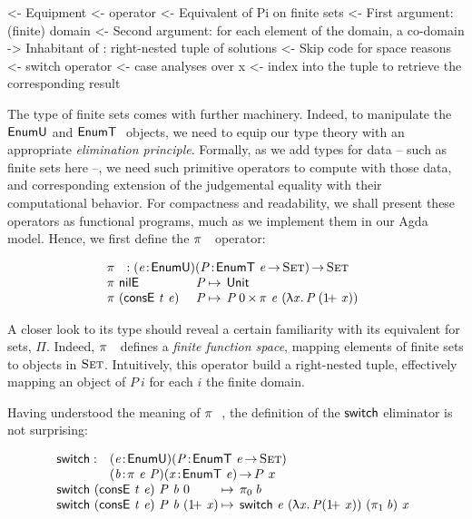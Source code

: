 \begin{wstructure}
<- Equipment
    <- \spi operator
        <- Equivalent of Pi on finite sets
        <- First argument: (finite) domain
        <- Second argument: for each element of the domain, a co-domain
        -> Inhabitant of \spi: right-nested tuple of solutions
            <- Skip code for space reasons
    <- switch operator
        <- case analyses over x
        <- index into the \spi tuple to retrieve the corresponding result
\end{wstructure}

The type of finite sets comes with further machinery. Indeed, to
manipulate the $\EnumU$ and $\EnumT{}$ objects, we need to equip our
type theory with an appropriate \emph{elimination
  principle}. Formally, as we add types for data -- such as finite
sets here --, we need such primitive operators to compute with those
data, and corresponding extension of the judgemental equality with
their computational behavior. For compactness and readability, we
shall present these operators as functional programs, much as we
implement them in our Agda model. Hence, we first define the
$\spi{}{}$ operator:

\[\stk{
\spi{}{} : \PITEL{\V{e}}{\EnumU}
           \PITEL{\V{P}}{\EnumT{\V{e}} \To \Set} \To \Set \\
\begin{array}{@{}ll@{\:\mapsto\:\:}l}
\spi{\NilE}{& \V{P}}        & \Unit \\
\spi{(\ConsE{\V{t}}{\V{e}})}{& \V{P}} & \TIMES{\V{P}\: \Ze}{\spi{\V{e}}{(\LAM{\V{x}} \V{P}\: (\Su{\V{x}}))}}
\end{array}
}\]

A closer look to its type should reveal a certain familiarity with its
equivalent for sets, $\Pi$. Indeed, $\spi{}{}$ defines a \emph{finite
  function space}, mapping elements of finite sets to objects in
$\Set$. Intuitively, this operator build a right-nested tuple,
effectively mapping an object of $P\:i$ for each $i$ the finite
domain.

Having understood the meaning of $\spi{}{}$, the definition of the
$\F{switch}$ eliminator is not surprising:

\[\stk{
\begin{array}{@{}ll}
\F{switch} : & \PITEL{\V{e}}{\EnumU}
               \PITEL{\V{P}}{\EnumT{\V{e}} \To \Set} \\
             & \PITEL{\V{b}}{\spi{\V{e}}{\V{P}}}
               \PITEL{\V{x}}{\EnumT{\V{e}}} \To P~x
\end{array} \\
\begin{array}{@{}l@{\:\mapsto\:\:}l}
\switch{(\ConsE{\V{t}}{\V{e}})}{\V{P}}{\V{b}}{\Ze}      & \fst{\V{b}} \\
\switch{(\ConsE{\V{t}}{\V{e}})}{\V{P}}{\V{b}}{(\Su{\V{x}})} & \switch{\V{e}}{(\LAM{\V{x}} \V{P}
  (\Su{\V{x}}))}{(\snd{\V{b}})}{\V{x}}
\end{array}
}\]


